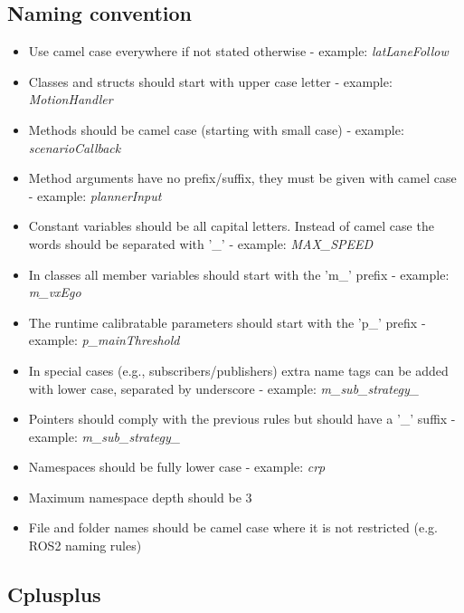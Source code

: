 \documentclass[sn-mathphys-num]{sn-jnl}%
\begin{document}
\subsection{Naming convention}
\begin{itemize}
    \item Use camel case everywhere if not stated otherwise - example: \emph{latLaneFollow}
    \item Classes and structs should start with upper case letter - example: \emph{MotionHandler}
    \item Methods should be camel case (starting with small case) - example: \emph{scenarioCallback}
    \item Method arguments have no prefix/suffix, they must be given with camel case - example: \emph{plannerInput}
    \item Constant variables should be all capital letters. Instead of camel case the words should be separated with '\_' - example: \emph{MAX\_SPEED}
    \item In classes all member variables should start with the 'm\_' prefix - example: \emph{m\_vxEgo}
    \item The runtime calibratable parameters should start with the 'p\_' prefix - example: \emph{p\_mainThreshold}
    \item In special cases (e.g., subscribers/publishers) extra name tags can be added with lower case, separated by underscore - example: \emph{m\_sub\_strategy\_}
    \item Pointers should comply with the previous rules but should have a '\_' suffix - example: \emph{m\_sub\_strategy\_}
    \item Namespaces should be fully lower case - example: \emph{crp}
    \item Maximum namespace depth should be 3
    \item File and folder names should be camel case where it is not restricted (e.g. ROS2 naming rules)
\end{itemize}

\subsection{Cplusplus}
\end{document}
